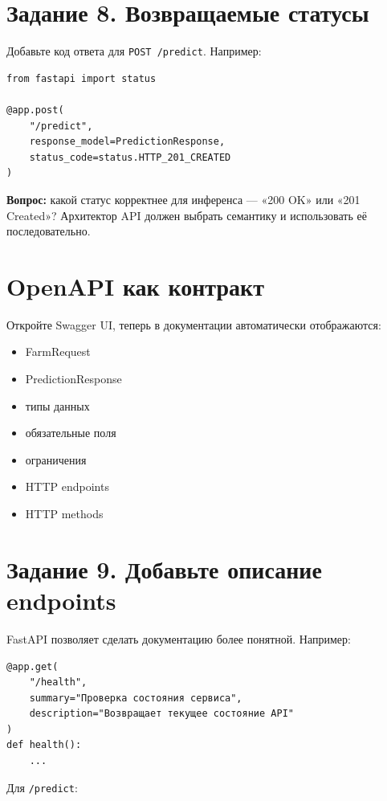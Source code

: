 \documentclass[12pt,a4paper]{article}
\begin{document}
\section{Задание 8. Возвращаемые статусы}

Добавьте код ответа для \texttt{POST /predict}. Например:

\begin{lstlisting}[caption={Явное указание кода ответа}]
from fastapi import status

@app.post(
    "/predict",
    response_model=PredictionResponse,
    status_code=status.HTTP_201_CREATED
)
\end{lstlisting}

\textbf{Вопрос:} какой статус корректнее для инференса — «200 OK» или «201 Created»? Архитектор API должен выбрать семантику и использовать её последовательно.

\section{OpenAPI как контракт}

Откройте Swagger UI, теперь в документации автоматически отображаются:

\begin{itemize}
    \item FarmRequest
    \item PredictionResponse
    \item типы данных
    \item обязательные поля
    \item ограничения
    \item HTTP endpoints
    \item HTTP methods
\end{itemize}

\section{Задание 9. Добавьте описание endpoints}

FastAPI позволяет сделать документацию более понятной. Например:

\begin{lstlisting}[caption={Описание /health}]
@app.get(
    "/health",
    summary="Проверка состояния сервиса",
    description="Возвращает текущее состояние API"
)
def health():
    ...
\end{lstlisting}

Для \texttt{/predict}:
\end{document}
